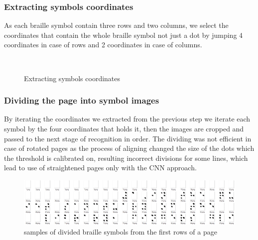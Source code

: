 \subsubsection{Extracting symbols coordinates}
As each braille symbol contain three rows and two columns, we select the coordinates that contain the whole braille symbol not just a dot by jumping 4 coordinates in case of rows and 2 coordinates in case of columns.
\begin{figure}[!ht]
    \centering
    \hfill
    \\
    \caption{Extracting symbols coordinates}
    \label{fig:Extracting symbols coordinates}
\end{figure}

\newpage
\subsubsection{Dividing the page into symbol images}
By iterating the coordinates we extracted from the previous step we iterate each symbol by the four coordinates that holds it, then the images are cropped and passed to the next stage of recognition in order. The dividing was not efficient in case of rotated pages as the process of aligning changed the size of the dots which the threshold is calibrated on, resulting incorrect divisions for some lines, which lead to use of straightened pages only with the CNN approach.

\begin{figure}[!ht]
\centering
\includegraphics[width=1\linewidth]{6.1.9.png}
\caption{samples of divided braille symbols from the first rows of a page}
\label{fig:samples of divided braille symbols from the first rows of a page}
\end{figure} 


